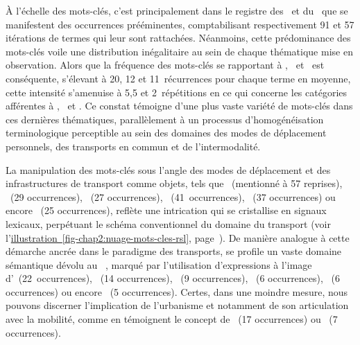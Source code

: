 \begin{refsegment}
À l'échelle des mots-clés, c'est principalement dans le registre des ~et du ~que se manifestent des occurrences prééminentes, comptabilisant respectivement 91 et 57 itérations de termes qui leur sont rattachées. Néanmoins, cette prédominance des mots-clés voile une distribution inégalitaire au sein de chaque thématique mise en observation. Alors que la fréquence des mots-clés se rapportant à , ~et ~est conséquente, s'élevant à 20, 12 et 11~récurrences pour chaque terme en moyenne, cette intensité s'amenuise à 5,5 et 2~répétitions en ce qui concerne les catégories afférentes à , ~et . Ce constat témoigne d'une plus vaste variété de mots-clés dans ces dernières thématiques, parallèlement à un processus d'homogénéisation terminologique perceptible au sein des domaines des modes de déplacement personnels, des transports en commun et de l'intermodalité.%

La manipulation des mots-clés sous l'angle des modes de déplacement et des infrastructures de transport comme objets, tels que ~(mentionné à 57 reprises), ~(29 occurrences), ~(27 occurrences), ~(41~occurrences), ~(37 occurrences) ou encore ~(25 occurrences), reflète une intrication qui se cristallise en signaux lexicaux, perpétuant le schéma conventionnel du domaine du transport (voir l'\hyperref[fig-chap2:nuage-mots-cles-rsl]{illustration~\ref{fig-chap2:nuage-mots-cles-rsl}}, page~\pageref{fig-chap2:nuage-mots-cles-rsl}). De manière analogue à cette démarche ancrée dans le paradigme des transports, se profile un vaste domaine sémantique dévolu au ~\textcolor{blue}{\autocites{sheller_new_2006}[8]{sheller_mobilizing_2016}[13]{randell_no_2020}}, marqué par l'utilisation d'expressions à l'image d'~(22~occurrences), ~(14 occurrences), ~(9 occurrences), ~(6 occurrences), ~(6 occurrences) ou encore ~(5 occurrences). Certes, dans une moindre mesure, nous pouvons discerner l'implication de l'urbanisme et notamment de son articulation avec la mobilité, comme en témoignent le concept de ~(17 occurrences) ou ~(7 occurrences).%


\end{refsegment}
